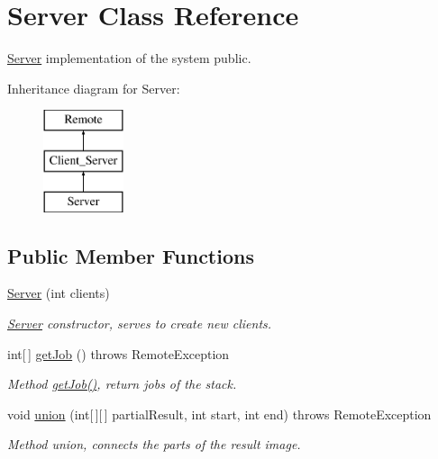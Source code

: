 \hypertarget{class_server}{}\section{Server Class Reference}
\label{class_server}


\hyperlink{class_server}{Server} implementation of the system  public.  


Inheritance diagram for Server\+:\begin{figure}[H]
\begin{center}
\leavevmode
\includegraphics[height=3.000000cm]{class_server}
\end{center}
\end{figure}
\subsection*{Public Member Functions}
\begin{DoxyCompactItemize}
\item 
\hyperlink{class_server_a766ab923c89579e657e52be4f4ae2997}{Server} (int clients)
\begin{DoxyCompactList}\small\item\em \hyperlink{class_server}{Server} constructor, serves to create new clients. \end{DoxyCompactList}\item 
int\mbox{[}$\,$\mbox{]} \hyperlink{class_server_ae9a3984aeeb93c13eaccfe33612148b0}{get\+Job} ()  throws Remote\+Exception
\begin{DoxyCompactList}\small\item\em Method \hyperlink{class_server_ae9a3984aeeb93c13eaccfe33612148b0}{get\+Job()}, return jobs of the stack. \end{DoxyCompactList}\item 
void \hyperlink{class_server_ac394c6ed1551ad7ad4626ef1bbc1a2f5}{union} (int\mbox{[}$\,$\mbox{]}\mbox{[}$\,$\mbox{]} partial\+Result, int start, int end)  throws Remote\+Exception
\begin{DoxyCompactList}\small\item\em Method union, connects the parts of the result image. \end{DoxyCompactList}\end{DoxyCompactItemize}
